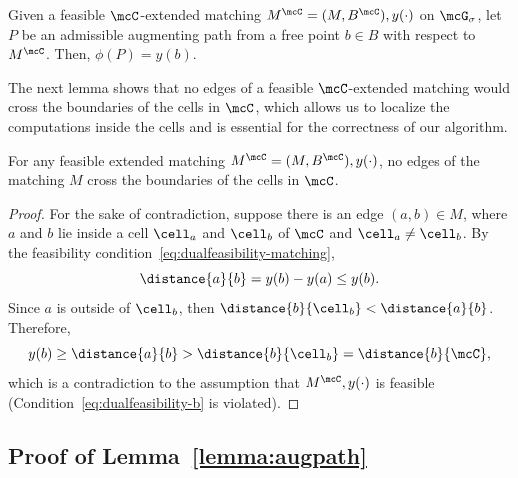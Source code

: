 \begin{corollary}
\label{cor:slackcost}
Given a feasible $\mcC$-extended matching $M^{\mcC} = (M, B^{\mcC}),y(\cdot)$ on $\mcG_\sigma$, let $P$ be an admissible augmenting path from a free point $b\in B$ with respect to $M^{\mcC}$. Then, $\phi(P)= y(b)$.
\end{corollary}

The next lemma shows that no edges of a feasible $\mcC$-extended matching would cross the boundaries of the cells in $\mcC$, which allows us to localize the computations inside the cells and is essential for the correctness of our algorithm.

\begin{lemma}\label{lemma:no-cross}
    For any feasible extended matching $M^\mcC=(M, B^\mcC), y(\cdot)$, no edges of the matching $M$ cross the boundaries of the cells in $\mcC$.
\end{lemma}
\begin{proof}
    For the sake of contradiction, suppose there is an edge $(a,b)\in M$, where $a$ and $b$ lie inside a cell $\cell_a$ and $\cell_b$ of $\mcC$ and $\cell_a\neq \cell_b$. By the feasibility condition~\eqref{eq:dualfeasibility-matching},
    \begin{equation*}
        \distance{a}{b} = y(b) - y(a) \le y(b).
    \end{equation*}
    Since $a$ is outside of $\cell_b$, then $\distance{b}{\cell_b}<\distance{a}{b}$. Therefore, 
    \[y(b)\ge \distance{a}{b}> \distance{b}{\cell_b}=\distance{b}{\mcC},\]
    which is a contradiction to the assumption that $M^\mcC, y(\cdot)$ is feasible (Condition~\eqref{eq:dualfeasibility-b} is violated).
\end{proof}


\subsection{Proof of Lemma~\ref{lemma:augpath}}

\netcost*

